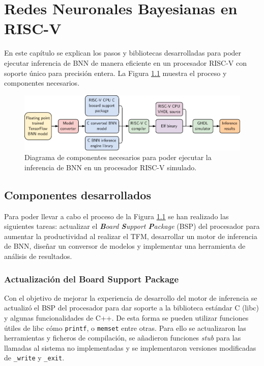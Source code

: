 \chapter{Redes Neuronales Bayesianas en RISC-V}

En este capítulo se explican los pasos y bibliotecas desarrolladas para poder ejecutar inferencia de BNN de manera eficiente en un procesador RISC-V con  soporte único para precisión entera. La Figura \ref{fig:experiment_pipeline} muestra el proceso y componentes necesarios.

\begin{figure}[h]
    \centering
    \includegraphics[width=\textwidth]{root/Imagenes/4_bnn_riscv/experiment_pipeline.pdf}
    \caption{Diagrama de componentes necesarios para poder ejecutar la inferencia de BNN en un procesador RISC-V simulado.}
    \label{fig:experiment_pipeline}
\end{figure}

\section{Componentes desarrollados}

Para poder llevar a cabo el proceso de la Figura \ref{fig:experiment_pipeline} se han realizado las siguientes tareas: actualizar el \textit{\textbf{B}oard \textbf{S}upport \textbf{P}ackage} (BSP) del procesador para aumentar la productividad al realizar el TFM, desarrollar un motor de inferencia de BNN, diseñar  un conversor de modelos y implementar una herramienta de análisis de resultados.

\subsection{Actualización del Board Support Package}

Con el objetivo de mejorar la experiencia de desarrollo del motor de inferencia se actualizó el BSP del procesador para dar soporte a la biblioteca estándar C (libc) y algunas funcionalidades de C++. De esta forma se pueden utilizar funciones útiles de libc cómo \texttt{printf}, o \texttt{memset} entre otras. Para ello se actualizaron las herramientas y ficheros de compilación, se añadieron funciones \textit{stub} para las llamadas al sistema no implementadas y se implementaron versiones modificadas de \texttt{\_write} y \texttt{\_exit}.

